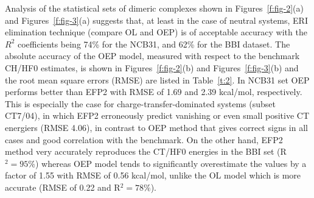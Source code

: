 \documentclass[aip,jcp,amsmath,amssymb,reprint,floatfix]{revtex4-1}
\begin{document}
Analysis of the statistical sets of dimeric complexes
shown in Figures~\ref{f:fig-2}(a) and Figures~\ref{f:fig-3}(a)
suggests that, at least in the case of neutral systems,
ERI elimination technique (compare OL and OEP)
is of acceptable accuracy with the $R^2$ coefficients
being 74\% for the NCB31, and 62\% for the BBI dataset. 
The absolute accuracy of the OEP model, measured with respect to the benchmark
CH/HF0 estimates, is shown in Figures~\ref{f:fig-2}(b) and Figures~\ref{f:fig-3}(b)
and the root mean square errors (RMSE)
are listed in Table~\ref{t:2}. In NCB31 set OEP performs better than EFP2
with
RMSE of 1.69 and 2.39 kcal/mol, respectively. This is especially
the case for charge\hyp{}transfer\hyp{}dominated systems (subset CT7/04),
in which EFP2 erroneously predict vanishing or even small
positive CT energiers (RMSE 4.06), in contrast to OEP method that gives correct
signs in all cases and good correlation with the benchmark.
On the other hand, EFP2 method very accurately reproduces the CT/HF0 energies
in the BBI set (R$^2=95\%$) whereas OEP model tends to significantly overestimate
the values by a factor of 1.55 with RMSE of 0.56 kcal/mol, 
unlike the OL model which is more accurate
(RMSE of 0.22 and R$^2=78\%$). 
%
\end{document}
